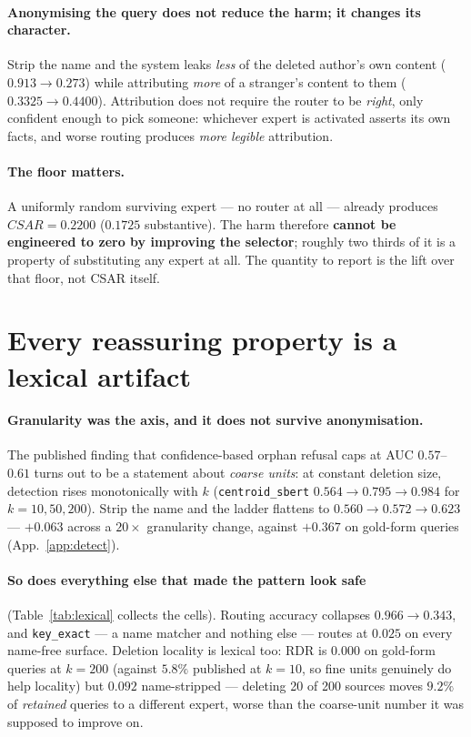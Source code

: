 \documentclass{article}
\newcommand{\csar}{CSAR}
\newcommand{\rdr}{RDR}
\begin{document}
\paragraph{Anonymising the query does not reduce the harm; it changes its character.} Strip the
name and the system leaks \emph{less} of the deleted author's own content ($0.913 \to 0.273$) while
attributing \emph{more} of a stranger's content to them ($0.3325 \to 0.4400$). Attribution does not
require the router to be \emph{right}, only confident enough to pick someone: whichever expert is
activated asserts its own facts, and worse routing produces \emph{more legible} attribution.

\paragraph{The floor matters.} A uniformly random surviving expert --- no router at all --- already
produces $\csar{} = 0.2200$ ($0.1725$ substantive). The harm therefore \textbf{cannot be engineered
to zero by improving the selector}; roughly two thirds of it is a property of substituting any
expert at all. The quantity to report is the lift over that floor, not \csar{} itself.

\section{Every reassuring property is a lexical artifact}
\label{sec:lexical}

\paragraph{Granularity was the axis, and it does not survive anonymisation.} The published finding
that confidence-based orphan refusal caps at AUC $0.57$--$0.61$ turns out to be a statement about
\emph{coarse units}: at constant deletion size, detection rises monotonically with $k$
(\texttt{centroid\_sbert} $0.564 \to 0.795 \to 0.984$ for $k=10,50,200$). Strip the name and the
ladder flattens to $0.560 \to 0.572 \to 0.623$ --- $+0.063$ across a $20\times$ granularity change,
against $+0.367$ on gold-form queries (App.~\ref{app:detect}).

\paragraph{So does everything else that made the pattern look safe} (Table~\ref{tab:lexical}
collects the cells). Routing accuracy collapses $0.966 \to 0.343$, and \texttt{key\_exact} --- a name matcher and
nothing else --- routes at $0.025$ on every name-free surface. Deletion locality is lexical too:
\rdr{} is $0.000$ on gold-form queries at $k=200$ (against $5.8\%$ published at $k=10$, so fine
units genuinely do help locality) but $0.092$ name-stripped --- deleting 20 of 200 sources moves
$9.2\%$ of \emph{retained} queries to a different expert, worse than the coarse-unit number it was
supposed to improve on.
\end{document}
